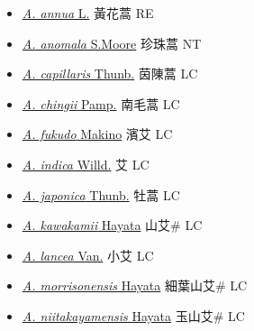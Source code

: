 \begin{itemize}
  \begin{itemize}
        \item[] \href{http://www.theplantlist.org/tpl1.1/search?q=Artemisia+annua}{\textit{A. annua} L.}   黃花蒿 RE
        \item[] \href{http://www.theplantlist.org/tpl1.1/search?q=Artemisia+anomala}{\textit{A. anomala} S.Moore}   珍珠蒿 NT
        \item[] \href{http://www.theplantlist.org/tpl1.1/search?q=Artemisia+capillaris}{\textit{A. capillaris} Thunb.}   茵陳蒿 LC
        \item[] \href{http://www.theplantlist.org/tpl1.1/search?q=Artemisia+chingii}{\textit{A. chingii} Pamp.}   南毛蒿 LC
        \item[] \href{http://www.theplantlist.org/tpl1.1/search?q=Artemisia+fukudo}{\textit{A. fukudo} Makino}   濱艾 LC
        \item[] \href{http://www.theplantlist.org/tpl1.1/search?q=Artemisia+indica}{\textit{A. indica} Willd.}   艾 LC
        \item[] \href{http://www.theplantlist.org/tpl1.1/search?q=Artemisia+japonica}{\textit{A. japonica} Thunb.}   牡蒿 LC
        \item[] \href{http://www.theplantlist.org/tpl1.1/search?q=Artemisia+kawakamii}{\textit{A. kawakamii} Hayata}   山艾\# LC
        \item[] \href{http://www.theplantlist.org/tpl1.1/search?q=Artemisia+lancea}{\textit{A. lancea} Van.}   小艾 LC
        \item[] \href{http://www.theplantlist.org/tpl1.1/search?q=Artemisia+morrisonensis}{\textit{A. morrisonensis} Hayata}   細葉山艾\# LC
        \item[] \href{http://www.theplantlist.org/tpl1.1/search?q=Artemisia+niitakayamensis}{\textit{A. niitakayamensis} Hayata}   玉山艾\# LC

\end{itemize}
\end{itemize}
